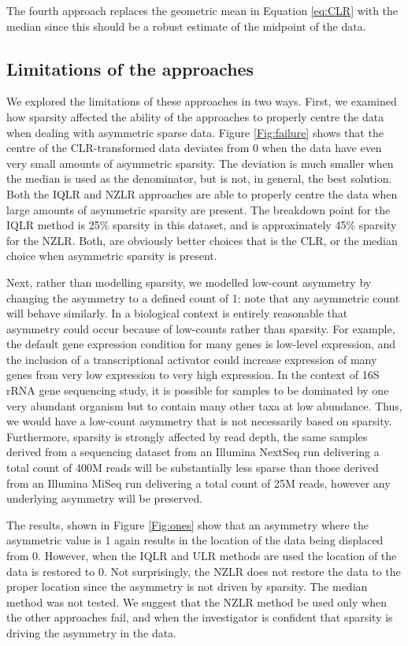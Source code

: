 \documentclass[10pt]{article}
\begin{document}
The fourth approach replaces the geometric mean in Equation \ref{eq:CLR} with the  median since this should be a robust estimate of the midpoint of the data. 

\subsection{Limitations of the approaches}
\vskip-0.25cm
We  explored the limitations of these approaches in two ways. First, we examined how  sparsity affected the ability of the approaches to properly centre the data when dealing with asymmetric sparse data. Figure \ref{Fig:failure} shows that the centre of the CLR-transformed data deviates from 0 when the data have even very small amounts of asymmetric sparsity. The deviation is much smaller when the median is used as the denominator, but is not, in general, the best solution. Both the IQLR and NZLR approaches are able to properly centre the data when large amounts of asymmetric sparsity are present. The breakdown point for the IQLR method is 25\% sparsity in this dataset, and is approximately  45\% sparsity for the NZLR. Both, are obviously better choices that is the CLR, or the median choice when asymmetric sparsity is present. 


Next, rather than modelling sparsity, we modelled low-count asymmetry by changing the asymmetry to a defined count of 1: note that any asymmetric count will behave similarly. In a biological context is entirely reasonable that asymmetry could occur because of low-counts  rather than sparsity. For example, the default gene expression condition for many genes is low-level expression, and the inclusion of a transcriptional activator could increase expression of many genes from very low expression to very high expression. In the context of 16S rRNA gene sequencing study, it is possible for samples to be dominated by one very abundant organism but to contain many other taxa at low abundance. Thus, we would have a low-count asymmetry that is not necessarily based on sparsity. Furthermore, sparsity is strongly affected by read depth, the same samples derived from a sequencing dataset from an Illumina NextSeq run delivering a total count of 400M reads will be substantially less sparse than those derived from an Illumina MiSeq run delivering a total count of 25M reads, however any underlying asymmetry will be preserved.

The results, shown in Figure \ref{Fig:ones} show that an asymmetry where the asymmetric value is 1 again results in the location of the data being displaced from 0. However, when the IQLR and ULR methods are used the location of the data is restored to 0. Not surprisingly, the NZLR does not restore the data to the proper location since the asymmetry is not driven by sparsity. The median method was not tested. We suggest that the NZLR method be used only when the other approaches fail, and when the investigator is confident that sparsity is driving the asymmetry in the data. 
\end{document}
